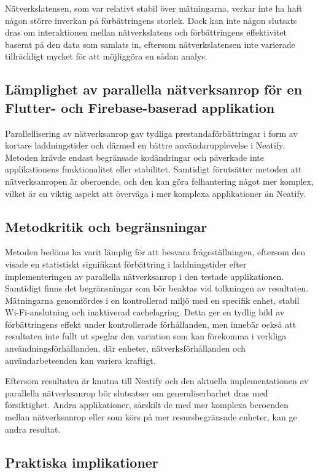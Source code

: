 \documentclass[letterpaper,twocolumn,10pt]{article}
\begin{document}
Nätverkslatensen, som var relativt stabil över mätningarna, verkar inte ha haft
någon större inverkan på förbättringens storlek. Dock kan inte någon slutsats
dras om interaktionen mellan nätverkslatens och förbättringens effektivitet
baserat på den data som samlats in, eftersom nätverkslatensen inte varierade
tillräckligt mycket för att möjliggöra en sådan analys. 

\subsection{Lämplighet av parallella nätverksanrop för en Flutter- och Firebase-baserad applikation}

Parallellisering av nätverksanrop gav tydliga prestandaförbättringar i form av
kortare laddningstider och därmed en bättre användarupplevelse i Neatify.
Metoden krävde endast begränsade kodändringar och påverkade inte applikationens
funktionalitet eller stabilitet. Samtidigt förutsätter metoden att
nätverksanropen är oberoende, och den kan göra felhantering något mer komplex,
vilket är en viktig aspekt att överväga i mer komplexa applikationer än Neatify. 

\subsection{Metodkritik och begränsningar}

Metoden bedöms ha varit lämplig för att besvara frågeställningen, eftersom den
visade en statistiskt signifikant förbättring i laddningstider efter
implementeringen av parallella nätverksanrop i den testade applikationen.
Samtidigt finns det begränsningar som bör beaktas vid tolkningen av resultaten.
Mätningarna genomfördes i en kontrollerad miljö med en specifik enhet, stabil
Wi-Fi-anslutning och inaktiverad cachelagring. Detta ger en tydlig bild av
förbättringens effekt under kontrollerade förhållanden, men innebär också att
resultaten inte fullt ut speglar den variation som kan förekomma i verkliga
användningsförhållanden, där enheter, nätverksförhållanden och användarbeteenden
kan variera kraftigt.

Eftersom resultaten är knutna till Neatify och den aktuella implementationen av
parallella nätverksanrop bör slutsatser om generaliserbarhet dras med
försiktighet. Andra applikationer, särskilt de med mer komplexa beroenden mellan
nätverksanrop eller som körs på mer resursbegränsade enheter, kan ge andra
resultat.

\subsection{Praktiska implikationer}
\end{document}
